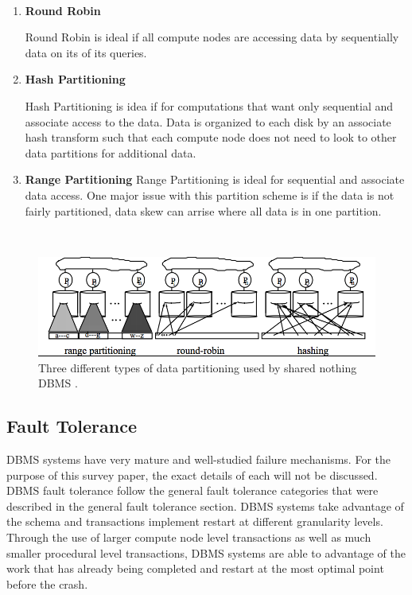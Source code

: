 \documentclass[10pt,twocolumn]{IEEEtran11}
\begin{document}
\  \\
\begin{enumerate}
	\setlength\itemsep{1em}
	\item 
	
	\textbf{Round Robin}
	
	Round Robin is ideal if all compute nodes are accessing data by sequentially data on its of its queries.
	\item 
		
	\textbf{Hash Partitioning}
	
	Hash Partitioning is idea if for computations that want only sequential and associate access to the data.  Data is organized to each disk by an associate hash transform such that each compute node does not need to look to other data partitions for additional data.
	
	\item 
	
	\textbf{Range Partitioning}
	Range Partitioning is ideal for sequential and associate data access.  One major issue with this partition scheme is if the data is not fairly partitioned, data skew can arrise where all data is in one partition.
	
\end{enumerate}
\  \\

\begin{figure}[h]
	\centering
	\includegraphics[scale=0.25]{images/dbmsDataPartition.png}
	\caption{Three different types of data partitioning used by shared nothing DBMS  \protect\cite{dewitt1992parallel}.}
	\label{fig:dbmsDataPartition}
\end{figure}

\subsection{Fault Tolerance}
DBMS systems have very mature and well-studied failure mechanisms.  For the purpose of this survey paper, the exact details of each will not be discussed.  DBMS fault tolerance follow the general fault tolerance categories that were described in the general fault tolerance section.  DBMS systems take advantage of the schema and transactions implement restart at different granularity levels.  Through the use of larger compute node level transactions as well as much smaller procedural level transactions, DBMS systems are able to 
advantage of the work that has already being completed and restart at the most optimal point before the crash.
\end{document}
